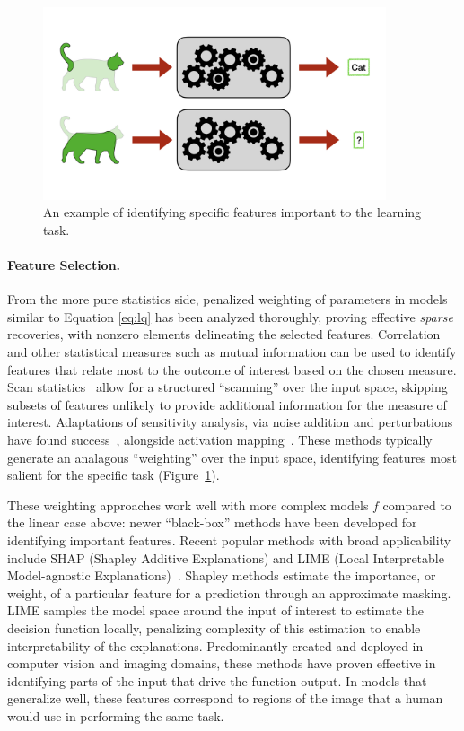 \begin{figure}
    \centering
    \includegraphics[trim={0 3cm 0 3cm},clip,width=0.9\textwidth]{1_intro/figs/feat_select.png}
    \caption[Visualization of feature selection]{An example of identifying specific features important to the learning task.}
    \label{fig:feat_select}
\end{figure}
\paragraph{Feature Selection.} 
From the more pure statistics side,
penalized weighting of parameters in models similar to Equation \eqref{eq:lq} has been
analyzed thoroughly, proving effective \textit{sparse} recoveries, with
nonzero elements delineating the selected features.
Correlation and other statistical measures such as mutual information can be used to 
identify features that relate most to the outcome of interest
based on the chosen measure.
Scan statistics~\citep{scanstat,scanstatlrt} allow for a structured ``scanning'' over the input space, skipping subsets of features unlikely to provide additional information for the measure of interest.
Adaptations of sensitivity analysis, via noise addition and perturbations have found success~\citep{yeung2010sensitivity,zhang2015sensitivity}, alongside activation mapping~\citep{cam,selvaraju2017grad}.
These methods typically generate an analagous ``weighting'' over the input space, identifying features most salient for the specific task (Figure~\ref{fig:feat_select}).

These weighting approaches work well with more complex models $f$ compared to the linear case above: newer ``black-box'' methods have been developed for identifying important features.
Recent popular methods with broad applicability include SHAP (Shapley Additive Explanations) and LIME (Local Interpretable Model-agnostic Explanations)~\cite{shap,lime}.
Shapley methods estimate the importance, or weight, of a particular feature for a prediction through an approximate masking.
LIME samples the model space around the input of interest to estimate the decision function locally, penalizing complexity of this estimation to enable interpretability of the explanations.
Predominantly created and deployed in computer vision and imaging domains, these methods have proven effective in identifying parts of the input that drive the function output.
In models that generalize well, these features correspond to regions of the image that a human would use in performing the same task.


